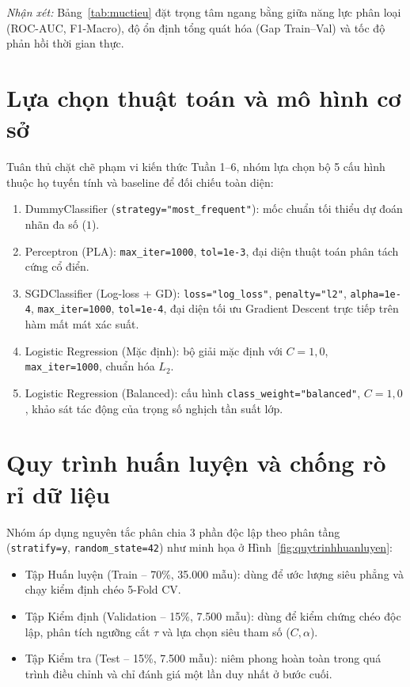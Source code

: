 \documentclass[12pt,a4paper,oneside]{report}
\begin{document}
\textit{Nhận xét:} Bảng~\ref{tab:muctieu} đặt trọng tâm ngang bằng giữa năng lực phân loại (ROC-AUC, F1-Macro), độ ổn định tổng quát hóa (Gap Train--Val) và tốc độ phản hồi thời gian thực.

\section{Lựa chọn thuật toán và mô hình cơ sở}

Tuân thủ chặt chẽ phạm vi kiến thức Tuần 1--6, nhóm lựa chọn bộ 5 cấu hình thuộc họ tuyến tính và baseline để đối chiếu toàn diện:
\begin{enumerate}
  \item DummyClassifier (\texttt{strategy="most\_frequent"}): mốc chuẩn tối thiểu dự đoán nhãn đa số ($1$).
  \item Perceptron (PLA): \texttt{max\_iter=1000}, \texttt{tol=1e-3}, đại diện thuật toán phân tách cứng cổ điển.
  \item SGDClassifier (Log-loss + GD): \texttt{loss="log\_loss"}, \texttt{penalty="l2"}, \texttt{alpha=1e-4}, \texttt{max\_iter=1000}, \texttt{tol=1e-4}, đại diện tối ưu Gradient Descent trực tiếp trên hàm mất mát xác suất.
  \item Logistic Regression (Mặc định): bộ giải mặc định với $C=1{,}0$, \texttt{max\_iter=1000}, chuẩn hóa $L_2$.
  \item Logistic Regression (Balanced): cấu hình \texttt{class\_weight="balanced"}, $C=1{,}0$, khảo sát tác động của trọng số nghịch tần suất lớp.
\end{enumerate}

\section{Quy trình huấn luyện và chống rò rỉ dữ liệu}

Nhóm áp dụng nguyên tắc phân chia 3 phần độc lập theo phân tầng (\texttt{stratify=y}, \texttt{random\_state=42}) như minh họa ở Hình~\ref{fig:quytrinhhuanluyen}:
\begin{itemize}
  \item Tập Huấn luyện (Train -- 70\%, 35.000 mẫu): dùng để ước lượng siêu phẳng và chạy kiểm định chéo 5-Fold CV.
  \item Tập Kiểm định (Validation -- 15\%, 7.500 mẫu): dùng để kiểm chứng chéo độc lập, phân tích ngưỡng cắt $\tau$ và lựa chọn siêu tham số ($C, \alpha$).
  \item Tập Kiểm tra (Test -- 15\%, 7.500 mẫu): niêm phong hoàn toàn trong quá trình điều chỉnh và chỉ đánh giá một lần duy nhất ở bước cuối.
\end{itemize}
\end{document}
